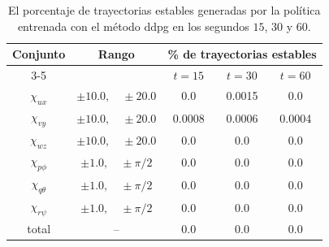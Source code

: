 \begin{table}[H]
\centering
\caption{El porcentaje de trayectorias estables generadas por la política entrenada con el método \acrshort{ddpg} en los segundos $15$, $30$ y $60$.}
\label{tab:stability_region_ddpg}
\begin{tabular}{|c|c|c|c|c|}
\hline
\multirow{2}{*}{Conjunto} & \multirow{2}{*}{Rango} & \multicolumn{3}{c|}{\% de trayectorias estables} \\ \cline{3-5}
                          &                          & $t=15$ & $t=30$ & $t=60$                       \\ \hline
$\chi_{ux}$ & $\pm\text{10.0},\quad\pm\text{20.0}$ & 0.0 & 0.0015  & 0.0       \\
$\chi_{vy}$ & $\pm\text{10.0},\quad\pm\text{20.0}$ & 0.0008 & 0.0006  & 0.0004       \\
$\chi_{wz}$ & $\pm\text{10.0},\quad\pm\text{20.0}$ & 0.0 & 0.0  & 0.0      \\
$\chi_{p\phi}$ & $\pm\text{1.0},\quad\pm\pi/2$ & 0.0 & 0.0  & 0.0\\
$\chi_{q\theta}$ & $\pm\text{1.0},\quad\pm\pi/2$ & 0.0 & 0.0  & 0.0\\
$\chi_{r\psi}$ & $\pm\text{1.0},\quad\pm\pi/2$ & 0.0 & 0.0  & 0.0\\
total         & --            & 0.0 & 0.0  & 0.0 \\
\hline
\end{tabular}
\end{table}

